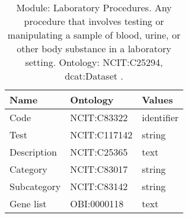 \documentclass{article}
\begin{document}
\begin{table}[htb]
\begin{tabular}{lll}
Name & Ontology & Values \\
\hline
Code & NCIT:C83322  & identifier \\
Test & NCIT:C117142  & string \\
Description & NCIT:C25365  & text \\
Category & NCIT:C83017  & string \\
Subcategory & NCIT:C83142  & string \\
Gene list & OBI:0000118  & text \\
\hline
\end{tabular}
\caption[Module: Laboratory Procedures]{\label{table:table9} Module: Laboratory Procedures. Any procedure that involves testing or manipulating a sample of blood, urine, or other body substance in a laboratory setting. Ontology: NCIT:C25294, dcat:Dataset . }
\end{table}
\end{document}
